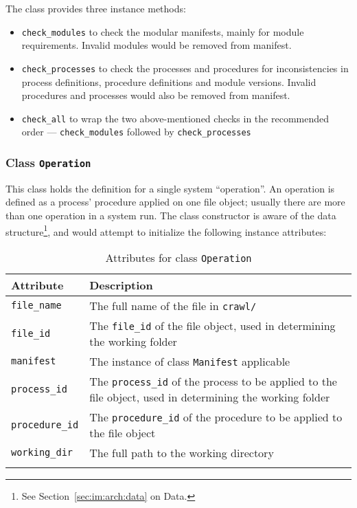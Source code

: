 The class provides three instance methods:

\begin{itemize}
    \item \texttt{check\_modules} to check the modular manifests, mainly
    for module requirements. Invalid modules would be removed from manifest.
    \item \texttt{check\_processes} to check the processes and procedures
    for inconsistencies in process definitions, procedure definitions and
    module versions. Invalid procedures and processes would also be removed
    from manifest.
    \item \texttt{check\_all} to wrap the two above-mentioned checks in
    the recommended order --- \texttt{check\_modules} followed by
    \texttt{check\_processes}
\end{itemize}

\subsubsection{Class \texttt{Operation}}

This class holds the definition for a single system ``operation''. An
operation is defined as a process' procedure applied on one file object;
usually there are more than one operation in a system run. The class
constructor is aware of the data structure\footnote{See
Section~\ref{sec:im:arch:data} on Data.}, and would attempt to initialize
the following instance attributes:

\begin{longtabu}{X[1,l]X[4,l]}
    \textbf{Attribute} & \textbf{Description} \\
    \midrule
    \endhead{}
    \texttt{file\_name} &
    The full name of the file in \texttt{crawl/} \\
    \texttt{file\_id} &
    The \texttt{file\_id} of the file object, used in determining
    the working folder \\
    \texttt{manifest} &
    The instance of class \texttt{Manifest} applicable \\
    \texttt{process\_id} &
    The \texttt{process\_id} of the process to be applied to the
    file object, used in determining the working folder \\
    \texttt{procedure\_id} &
    The \texttt{procedure\_id} of the procedure to be applied to the
    file object \\
    \newpage
    \texttt{working\_dir} & 
    The full path to the working directory \\
    \caption{Attributes for class \texttt{Operation}}
\end{longtabu}

